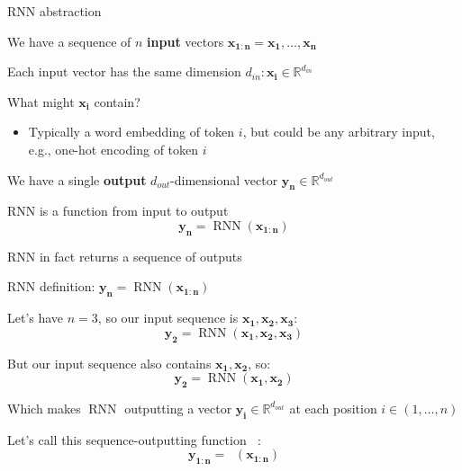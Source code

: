 \documentclass[12pt,aspectratio=169,handout]{beamer}
\DeclareMathOperator*{\rnn}{RNN}
\DeclareMathOperator*{\rnnstar}{RNN^{*}}
\begin{document}
\begin{frame}{RNN abstraction}

We have a sequence of $n$ \textbf{input} vectors $\bm{x_{1:n}} = \bm{x_1}, \ldots, \bm{x_n}$

Each input vector has the same dimension $d_{in}: \bm{x_i} \in \mathbb{R}^{d_{in}}$

\bigskip

What might $\bm{x_i}$ contain?
\begin{itemize}
	\item Typically a word embedding of token $i$, but could be any arbitrary input, e.g., one-hot encoding of token $i$
\end{itemize}
\bigskip

\pause

We have a single \textbf{output} $d_{out}$-dimensional vector $\bm{y_n} \in \mathbb{R}^{d_{out}}$

\bigskip

RNN is a function from input to output
$$
\bm{y_n} = \rnn (\bm{x_{1:n}})
$$
\end{frame}


\begin{frame}{RNN in fact returns a sequence of outputs}

RNN definition: $\bm{y_n} = \rnn (\bm{x_{1:n}})$

Let's have $n = 3$, so our input sequence is $\bm{x_{1}}, \bm{x_2}, \bm{x_3}$:
$$
\bm{y_2} = \rnn (\bm{x_{1}}, \bm{x_2}, \bm{x_3})
$$

\pause

But our input sequence also contains $\bm{x_{1}}, \bm{x_2}$, so:
$$
\bm{y_2} = \rnn (\bm{x_{1}}, \bm{x_2})
$$

Which makes $\rnn$ outputting a vector $\bm{y_i} \in \mathbb{R}^{d_{out}}$ at each position $i \in (1, \ldots, n)$

Let's call this sequence-outputting function $\rnnstar$:
$$
\bm{y_{1:n}} = \rnnstar (\bm{x_{1:n}})
$$

\end{frame}
\end{document}
